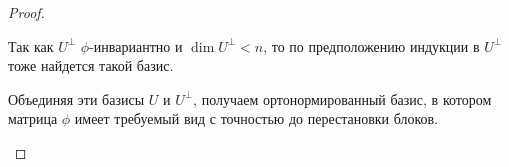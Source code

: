 \documentclass[a4paper]{article}
\begin{document}
\begin{colloq}
\begin{proof}
\begin{description}
                    Так как $U^{\perp}$ $\phi$-инвариантно и $\dim U^{\perp} < n$, то по предположению индукции в $U^{\perp}$ тоже найдется такой базис.

                    Объединяя эти базисы $U$ и $U^{\perp}$, получаем ортонормированный базис, в котором матрица $\phi$ имеет требуемый вид с точностью до перестановки блоков.
                    \qedhere
                \end{description}
            \end{proof}


    \end{colloq}
\end{document}
